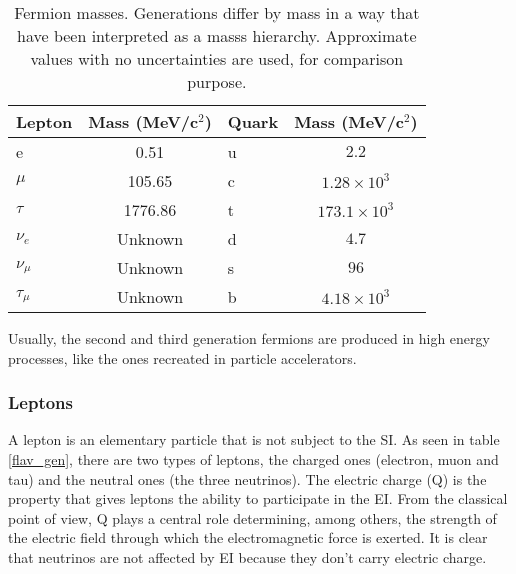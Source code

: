 \begin{center}
\begin{table}[h]
\centering
\footnotesize
\begin{tabular}{lclc} \hline
Lepton    & Mass (MeV/c$^2$) & Quark  & Mass (MeV/c$^2$)       \\ \hline
e         & 0.51             & u      & $ 2.2$             \\ %
$\mu$     & 105.65           & c      & $ 1.28\times 10^3$ \\ %
$\tau$    & 1776.86          & t      & $ 173.1\times 10^3$\\ %
$\nu_e$   & Unknown          & d      & $ 4.7$             \\ %
$\nu_\mu$ & Unknown          & s      & $ 96$              \\ %
$\tau_\mu$& Unknown          & b      & $ 4.18\times 10^3$ \\ \hline
\end{tabular}
\caption[Fermion masses.]{Fermion masses\cite{pdg}. Generations differ by mass in a way that have been interpreted as a masss hierarchy. Approximate values with no uncertainties are used, for comparison purpose.}\label{f_masses}
\end{table}
\end{center}

\noindent Usually, the second and third generation fermions are produced in high energy processes, like the ones recreated in particle accelerators.         

\subsubsection{Leptons}

\noindent A lepton is an elementary particle that is not subject to the SI. As seen in table \ref{flav_gen}, there are two types of leptons, the charged ones (electron, muon and tau) and the neutral ones (the three neutrinos). The electric charge (Q) is the property that gives leptons the ability to participate in the EI. From the classical point of view, Q plays a central role determining, among others, the strength of the electric field through which the electromagnetic force is exerted. It is clear that neutrinos are not affected by EI because they don't carry electric charge.\\

